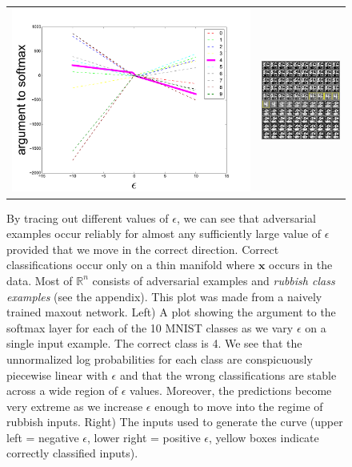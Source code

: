\documentclass{article} %
\def\eps{{\epsilon}}
\def\veta{{\bm{\eta}}}
\def\vx{{\bm{x}}}
\begin{document}
\begin{figure}
    \centering
    \begin{tabular}{cc}
        \includegraphics[width=.4\textwidth]{eps_curve.pdf} &
        \includegraphics[width=.3\textwidth]{eps_curve_inputs.png}
    \end{tabular}
    \caption{
By tracing out different values of $\eps$, we can see that adversarial examples occur reliably
for almost any sufficiently large value of $\eps$ provided that we move in
the correct direction. Correct classifications occur only on a thin manifold where $\vx$ occurs in the data.
Most of $\mathbb{R}^n$ consists of adversarial examples and {\em rubbish class examples} (see the appendix).
This plot was made from a naively trained maxout network.
Left) A plot showing the argument to the softmax layer for each of the 10 MNIST classes as we vary $\eps$ on a single input example.
The correct class is 4. We see that the unnormalized log probabilities for each class are conspicuously piecewise linear with $\eps$ and that
the wrong classifications are stable across a wide region of $\eps$ values. Moreover, the predictions become very extreme as we
increase $\eps$ enough to move into the regime of rubbish inputs.
Right) The inputs used to generate the curve (upper left = negative $\eps$, lower right = positive $\eps$, yellow boxes indicate
correctly classified inputs).
    }
    \label{fig:eps_curve}
\end{figure}
\end{document}
